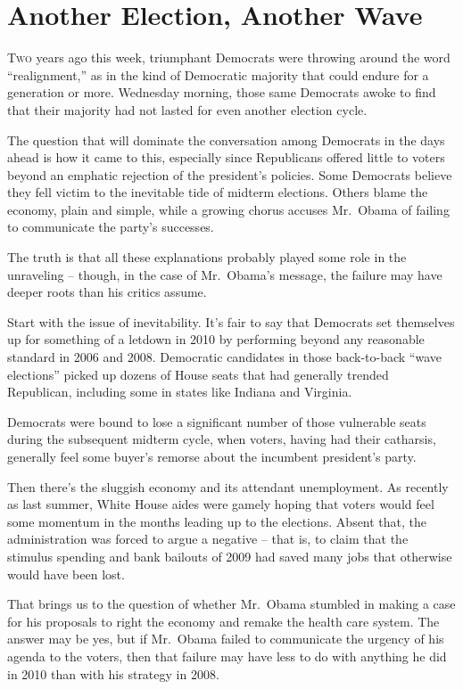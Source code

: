 ﻿\documentclass[12pt]{article}
\begin{document}
\section{Another Election, Another Wave}

\lettrine{T}{wo} years ago this week, triumphant Democrats were throwing
around the word ``realignment,'' as in the kind of Democratic majority that could endure for a
generation or more. Wednesday morning, those same Democrats awoke to find that their majority had
not lasted for even another election cycle.

The question that will dominate the conversation among Democrats in the days ahead is how it came to
this, especially since Republicans offered little to voters beyond an emphatic rejection of the
president's policies. Some Democrats believe they fell victim to the inevitable tide of midterm
elections. Others blame the economy, plain and simple, while a growing chorus accuses Mr.~Obama of
failing to communicate the party's successes.

The truth is that all these explanations probably played some role in the unraveling -- though, in
the case of Mr.~Obama's message, the failure may have deeper roots than his critics assume.

Start with the issue of inevitability. It's fair to say that Democrats set themselves up for
something of a letdown in 2010 by performing beyond any reasonable standard in 2006 and 2008.
Democratic candidates in those back-to-back ``wave elections'' picked up dozens of House seats that
had generally trended Republican, including some in states like Indiana and Virginia.

Democrats were bound to lose a significant number of those vulnerable seats during the subsequent
midterm cycle, when voters, having had their catharsis, generally feel some buyer's remorse about
the incumbent president's party.

Then there's the sluggish economy and its attendant unemployment. As recently as last summer, White
House aides were gamely hoping that voters would feel some momentum in the months leading up to the
elections. Absent that, the administration was forced to argue a negative -- that is, to claim that
the stimulus spending and bank bailouts of 2009 had saved many jobs that otherwise would have been
lost.

That brings us to the question of whether Mr.~Obama stumbled in making a case for his proposals to
right the economy and remake the health care system. The answer may be yes, but if Mr.~Obama failed
to communicate the urgency of his agenda to the voters, then that failure may have less to do with
anything he did in 2010 than with his strategy in 2008.
\end{document}
